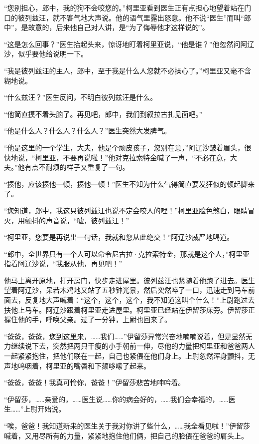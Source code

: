 \par “您别担心，郎中，我的狗不会咬您的。”柯里亚看到医生正有点担心地望着站在门口的彼列兹汪，就不客气地大声说。他的语气里露出怒意。他不说“医生”而叫“郎中”，是故意的，后来他自己对人讲，是“为了侮辱他才这样说的”。
\par “这是怎么回事？”医生抬起头来，惊讶地盯着柯里亚说，“他是谁？”他忽然问阿辽沙，似乎要他给说明一下。
\par “我是彼列兹汪的主人，郎中，至于我是什么人您就不必操心了。”柯里亚又毫不含糊地说。
\par “什么兹汪？”医生反问，不明白彼列兹汪是什么。
\par “他简直摸不着头脑了。再见吧，郎中，我们到叙拉古扎见面吧。”
\par “他是什么人？什么人？什么人？”医生突然大发脾气。
\par “他是这里的一个学生，大夫，他是个顽皮孩子，您别在意，”阿辽沙皱着眉头，很快地说，“柯里亚，不要再说啦！”他对克拉索特金喊了一声，“不必在意，大夫。”他有点不耐烦的样子又重复了一句。
\par “揍他，应该揍他一顿，揍他一顿！”医生不知为什么气得简直要发狂似的顿起脚来了。
\par “您知道，郎中，我这只彼列兹汪也说不定会咬人的哩！”柯里亚脸色煞白，眼睛冒火，用颤抖的声音说，“嘘，彼列兹汪！”
\par “柯里亚，您要是再说出一句话，我就和您从此绝交！”阿辽沙威严地喝道。
\par “郎中，全世界只有一个人可以命令尼古拉·克拉索特金，那就是这个人，”柯里亚指着阿辽沙说，“我服从他，再见吧！”
\par 他马上离开原地，打开房门，快步走进屋里。彼列兹汪也紧随着他跑了进去。医生望着阿辽沙，呆若木鸡地又站了五秒钟光景，然后突然啐了一口，迅速走到马车前面去，反复地大声喊着：“这个，这个，这个，我不知道这叫个什么！”上尉跑过去扶他上马车。阿辽沙跟着柯里亚走进屋里。柯里亚已经站在伊留莎床旁。伊留莎正握住他的手，呼唤父亲。过了一分钟，上尉也回来了。
\par “爸爸，爸爸，您到这里来，……我们……”伊留莎异常兴奋地喃喃说着，但是显然无力继续说下去，突然把两只干瘦的小手朝前一伸，尽他的力量把柯里亚和爸爸两人一起紧紧抱住，把他们联在一起，自己也紧偎在他们身上。上尉忽然浑身颤抖，无声地呜咽着，柯里亚的嘴唇和下颏哆嗦了起来。
\par “爸爸，爸爸！我真可怜你，爸爸！”伊留莎悲苦地呻吟着。
\par “伊留莎，……亲爱的，……医生说……你的病会好的，……我们会幸福的，……医生……”上尉开始说。
\par “唉，爸爸！我知道新来的医生关于我对你讲了些什么，……我全看见啦！”伊留莎喊着，又用尽所有的力量，紧紧地抱住他们俩，把自己的脸偎在爸爸的肩头上。
